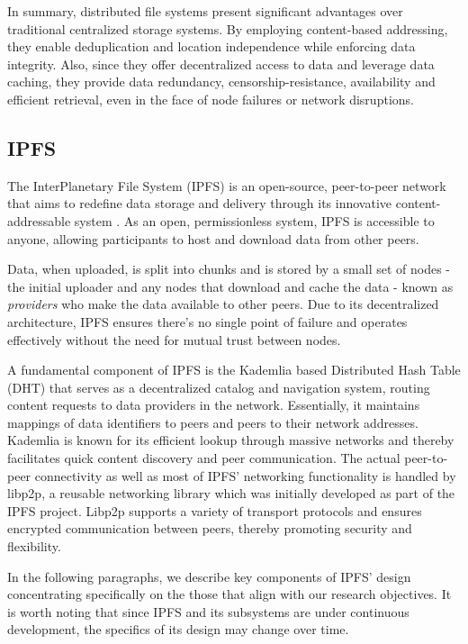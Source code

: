 In summary, distributed file systems present significant advantages over traditional centralized storage systems. By employing content-based addressing, they enable deduplication and location independence while enforcing data integrity. Also, since they offer decentralized access to data and leverage data caching, they provide data redundancy, censorship-resistance, availability and efficient retrieval, even in the face of node failures or network disruptions.

\subsection{IPFS}\label{sec:ipfs}
The InterPlanetary File System (IPFS) is an open-source, peer-to-peer network that aims to redefine data storage and delivery through its innovative content-addressable system \citep{benet_2014}. As an open, permissionless system, IPFS is accessible to anyone, allowing participants to host and download data from other peers. 

Data, when uploaded, is split into chunks and is stored by a small set of nodes - the initial uploader and any nodes that download and cache the data - known as \textit{providers} who make the data available to other peers. Due to its decentralized architecture, IPFS ensures there's no single point of failure and operates effectively without the need for mutual trust between nodes.

A fundamental component of IPFS is the Kademlia based Distributed Hash Table (DHT) \citep{maymounkov_2002} that serves as a decentralized catalog and navigation system, routing content requests to data providers in the network. Essentially, it maintains mappings of data identifiers to peers and peers to their network addresses. Kademlia is known \citep{benet_2014} for its efficient lookup through massive networks and thereby facilitates quick content discovery and peer communication. The actual peer-to-peer connectivity as well as most of IPFS' networking functionality is handled by libp2p, a reusable networking library which was initially developed as part of the IPFS project. Libp2p \citep{libp2p_2023} supports a variety of transport protocols and ensures encrypted communication between peers, thereby promoting security and flexibility.

In the following paragraphs, we describe key components of IPFS’ design concentrating specifically on the those that align with our research objectives. It is worth noting that since IPFS and its subsystems are under continuous development, the specifics of its design may change over time.

